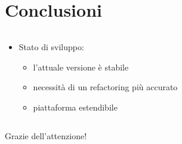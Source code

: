 \documentclass{beamer}
\begin{document}

\section{Conclusioni}
\begin{frame}{\secname}
	\begin{columns}
		\begin{column}{\textwidth}
			\begin{itemize}
				\item Stato di sviluppo:
					\begin{itemize}
						\item l'attuale versione è stabile
						\item necessità di un refactoring più accurato
						\item piattaforma estendibile
					\end{itemize}
			\end{itemize}
		\end{column}
	\end{columns}
\end{frame}
	
\begin{frame}{}
	\centering
	{\Large{Grazie dell'attenzione!}}
\end{frame}

\end{document}
